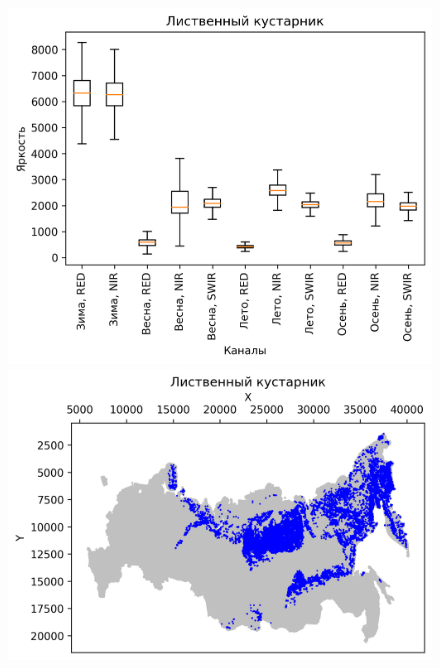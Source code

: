\documentclass[14pt, a4paper, oneside]{extarticle}
\begin{document}
\begin{figure}[H]
    \centering
    \includegraphics[]{class-9-boxplot}
    \includegraphics[]{class-9-map}
\end{figure}
\end{document}
